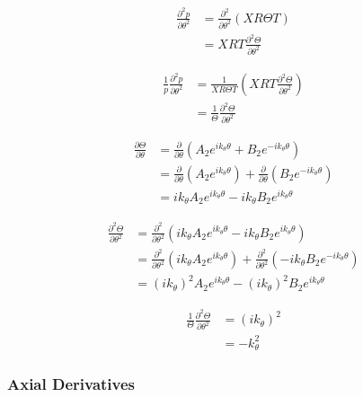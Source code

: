 \begin{align*}
    \frac{\partial^2 p}{\partial \theta^2} 
    &=
    \frac{\partial^2 }{\partial \theta^2}  \left( XR\Theta T \right) \\
    &=
    XRT\frac{\partial^2 \Theta }{\partial \theta^2}  
\end{align*}


\begin{align*}
    \frac{1}{p}\frac{\partial^2 p}{\partial \theta^2} 
    &=
    \frac{ 1}{X R \Theta T}  \left( XRT\frac{\partial^2 \Theta}{\partial \theta^2} \right) \\
    &=\frac{ 1}{ \Theta}\frac{\partial^2 \Theta}{\partial \theta^2}  
\end{align*}

\begin{align*}
    \frac{\partial \Theta}{\partial \theta} &=
    \frac{\partial}{\partial \theta}
        \left( 
            A_2 e^{i k_{\theta} \theta} + B_2 e^{-i k_{\theta} \theta}
        \right)  \\
    &=
    \frac{\partial}{\partial \theta} \left(A_2 e^{i k_{\theta} \theta}  \right) +
    \frac{\partial}{\partial \theta} \left(B_2 e^{-i k_{\theta} \theta}  \right)\\ 
    &= i k_{\theta} A_2 e^{i k_{\theta} \theta} - i k_{\theta} B_2 e^{i k_{\theta} \theta} 
\end{align*}

\begin{align*}
    \frac{\partial^2 \Theta }{\partial \theta^2} &=
    \frac{\partial^2}{\partial \theta^2}
        \left( 
        i k_{\theta} A_2 e^{i k_{\theta} \theta} - i k_{\theta} B_2 e^{i k_{\theta} \theta} 
    \right)  \\
    &=
    \frac{\partial^2}{\partial \theta^2} \left(i k_{\theta} A_2 e^{i k_{\theta} \theta}  \right) +
    \frac{\partial^2}{\partial \theta^2} \left(- i k_{\theta} B_2 e^{-i k_{\theta} \theta}  \right)\\ 
    &= (i k_{\theta})^2 A_2 e^{i k_{\theta} \theta } - (i k_{\theta})^2 B_2 e^{i k_{\theta} \theta} 
\end{align*}

\begin{align*}
    \frac{1}{\Theta}\frac{\partial^2 \Theta}{\partial \theta^2} 
    &=
    (ik_{\theta})^2 \\
    &= -k_{\theta}^2
\end{align*}

\subsubsection{Axial Derivatives}

